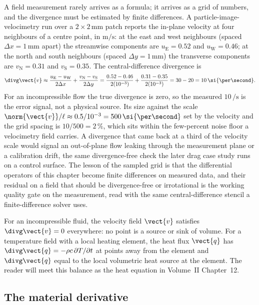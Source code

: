 \begin{example}
A field measurement rarely arrives as a formula; it arrives as a grid
of numbers, and the divergence must be estimated by finite differences.
A particle-image-velocimetry run over a $2\times 2\,\si{\milli\meter}$
patch reports the in-plane velocity at four neighbours of a centre
point, in $\si{\meter\per\second}$: at the east and west neighbours
(spaced $\Delta x = 1\,\si{\milli\meter}$ apart) the streamwise
components are $u_{\text{E}} = 0.52$ and $u_{\text{W}} = 0.46$; at the
north and south neighbours (spaced $\Delta y = 1\,\si{\milli\meter}$)
the transverse components are $v_{\text{N}} = 0.31$ and $v_{\text{S}} =
0.35$. The central-difference divergence is
\[
\divg\vect{v} \approx \frac{u_{\text{E}} - u_{\text{W}}}{2\Delta x} +
\frac{v_{\text{N}} - v_{\text{S}}}{2\Delta y} =
\frac{0.52 - 0.46}{2(10^{-3})} + \frac{0.31 - 0.35}{2(10^{-3})} =
30 - 20 = 10\,\si{\per\second}.
\]
For an incompressible flow the true divergence is zero, so the measured
$10\,\si{\per\second}$ is the error signal, not a physical source. Its
size against the scale $\norm{\vect{v}}/\ell \approx 0.5/10^{-3} =
500\,\si{\per\second}$ set by the velocity and the grid spacing is
$10/500 = 2\,\%$, which sits within the few-percent noise floor a
velocimetry field carries. A divergence that came back at a third of the
velocity scale would signal an out-of-plane flow leaking through the
measurement plane or a calibration drift, the same divergence-free
check the later drag case study runs on a control surface. The lesson
of the sampled grid is that the differential operators of this chapter
become finite differences on measured data, and their residual on a
field that should be divergence-free or irrotational is the working
quality gate on the measurement, read with the same central-difference
stencil a finite-difference solver uses.
\end{example}

For an incompressible fluid, the velocity field $\vect{v}$ satisfies
$\divg\vect{v} = 0$ everywhere: no point is a source or sink of
volume. For a temperature field with a local heating element, the
heat flux $\vect{q}$ has $\divg\vect{q} = -\rho c \,\partial T /
\partial t$ at points away from the element and $\divg\vect{q}$ equal
to the local volumetric heat source at the element. The reader will
meet this balance as the heat equation in Volume~II Chapter~12.

\subsection{The material derivative}

